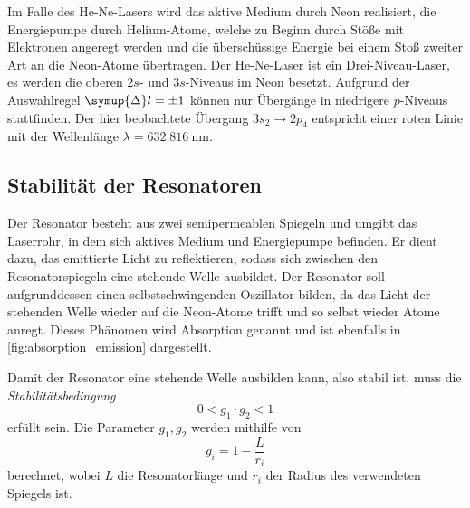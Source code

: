     Im Falle des He-Ne-Lasers wird das aktive Medium durch Neon realisiert,
    die Energiepumpe durch Helium-Atome,
    welche zu Beginn durch Stöße mit Elektronen angeregt werden und die überschüssige Energie bei einem Stoß zweiter Art an die Neon-Atome übertragen.
    Der He-Ne-Laser ist ein Drei-Niveau-Laser,
    es werden die oberen $2s$- und $3s$-Niveaus im Neon besetzt.
    Aufgrund der Auswahlregel $\symup{\Delta} l = \pm 1$ können nur Übergänge in niedrigere $p$-Niveaus stattfinden.
    Der hier beobachtete Übergang $3s_2 \to 2p_4$ entspricht einer roten Linie mit der Wellenlänge $\lambda = \SI{632.816}{\nano\meter}$.

\subsection{Stabilität der Resonatoren}
\label{sec:stabilitaet}

    Der Resonator besteht aus zwei semipermeablen Spiegeln und umgibt das Laserrohr,
    in dem sich aktives Medium und Energiepumpe befinden.
    Er dient dazu,
    das emittierte Licht zu reflektieren,
    sodass sich zwischen den Resonatorspiegeln eine stehende Welle ausbildet.
    Der Resonator soll aufgrunddessen einen selbstschwingenden Oszillator bilden,
    da das Licht der stehenden Welle wieder auf die Neon-Atome trifft und so selbst wieder Atome anregt.
    Dieses Phänomen wird Absorption genannt und ist ebenfalls in \autoref{fig:absorption_emission} dargestellt.

    Damit der Resonator eine stehende Welle ausbilden kann,
    also stabil ist,
    muss die \textit{Stabilitätsbedingung}
    \begin{equation}
        0 < g_1 \cdot g_2 < 1
        \label{eqn:stabilitaetsbedingung}
    \end{equation}
    erfüllt sein.
    Die Parameter $g_1, g_2$ werden mithilfe von
    \begin{equation}
        g_i = 1 - \frac{L}{r_i}
        \label{eqn:stabilitaetsparameter}
    \end{equation}
    berechnet,
    wobei $L$ die Resonatorlänge und $r_i$ der Radius des verwendeten Spiegels ist.


